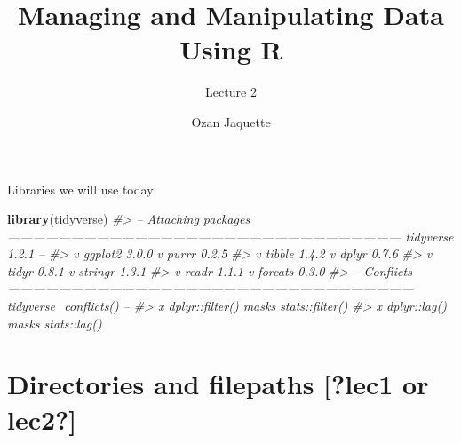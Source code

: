 \documentclass[8pt,ignorenonframetext,]{beamer}
\title{Managing and Manipulating Data Using R}
\subtitle{Lecture 2}
\author{Ozan Jaquette}
\date{}
\newenvironment{Shaded}{\begin{snugshade}}{\end{snugshade}}
\newcommand{\KeywordTok}[1]{\textcolor[rgb]{0.13,0.29,0.53}{\textbf{#1}}}
\newcommand{\CommentTok}[1]{\textcolor[rgb]{0.56,0.35,0.01}{\textit{#1}}}
\newcommand{\NormalTok}[1]{#1}
\begin{document}
\frame{\titlepage}

\begin{frame}
\tableofcontents[hideallsubsections]
\end{frame}

\begin{frame}

\end{frame}

\begin{frame}[fragile]{Libraries we will use today}

\begin{Shaded}
\begin{Highlighting}[]
\KeywordTok{library}\NormalTok{(tidyverse)}
\CommentTok{#> -- Attaching packages --------------------------------------------------------------------------------------------- tidyverse 1.2.1 --}
\CommentTok{#> v ggplot2 3.0.0     v purrr   0.2.5}
\CommentTok{#> v tibble  1.4.2     v dplyr   0.7.6}
\CommentTok{#> v tidyr   0.8.1     v stringr 1.3.1}
\CommentTok{#> v readr   1.1.1     v forcats 0.3.0}
\CommentTok{#> -- Conflicts ------------------------------------------------------------------------------------------------ tidyverse_conflicts() --}
\CommentTok{#> x dplyr::filter() masks stats::filter()}
\CommentTok{#> x dplyr::lag()    masks stats::lag()}
\end{Highlighting}
\end{Shaded}

\end{frame}

\section{Directories and filepaths {[}?lec1 or
lec2?{]}}\label{directories-and-filepaths-lec1-or-lec2}
\end{document}
